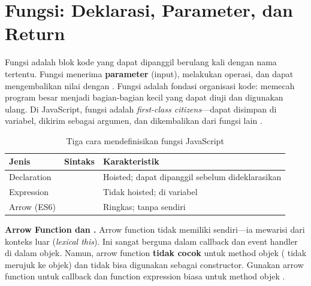 ﻿\section{Fungsi: Deklarasi, Parameter, dan Return}

Fungsi adalah blok kode yang dapat dipanggil berulang kali dengan nama tertentu. Fungsi menerima \textbf{parameter} (input), melakukan operasi, dan dapat mengembalikan nilai dengan . Fungsi adalah fondasi organisasi kode: memecah program besar menjadi bagian-bagian kecil yang dapat diuji dan digunakan ulang. Di JavaScript, fungsi adalah \textit{first-class citizens}---dapat disimpan di variabel, dikirim sebagai argumen, dan dikembalikan dari fungsi lain \cite{jsInfo}.


\begin{table}[H]
\centering
\begin{tabular}{|P{3.5cm}|P{4cm}|P{4.5cm}|}
\hline
\textbf{Jenis} & \textbf{Sintaks} & \textbf{Karakteristik} \\
\hline
Declaration &  & Hoisted; dapat dipanggil sebelum dideklarasikan \\
\hline
Expression &  & Tidak hoisted; di variabel \\
\hline
Arrow (ES6) &  & Ringkas; tanpa  sendiri \\
\hline
\end{tabular}
\caption{Tiga cara mendefinisikan fungsi JavaScript}
\end{table}

\begin{konsep}
\textbf{Arrow Function dan .} Arrow function tidak memiliki  sendiri---ia mewarisi  dari konteks luar (\textit{lexical this}). Ini sangat berguna dalam callback dan event handler di dalam objek. Namun, arrow function \textbf{tidak cocok} untuk method objek ( tidak merujuk ke objek) dan tidak bisa digunakan sebagai constructor. Gunakan arrow function untuk callback dan function expression biasa untuk method objek \cite{mdnJsGuide}.
\end{konsep}

